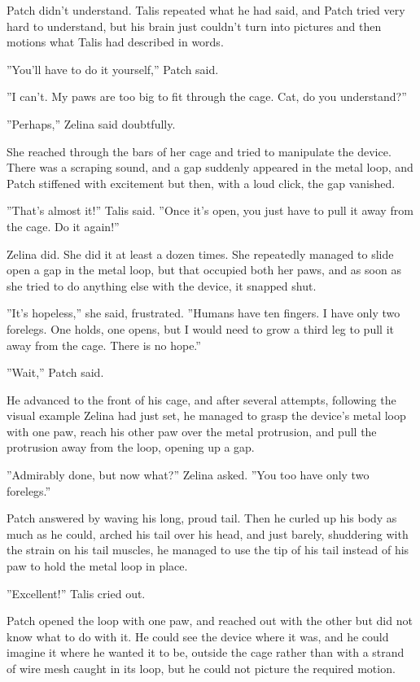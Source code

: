 \documentclass[12pt]{book}
\begin{document}
 Patch didn't understand. Talis repeated what he had said, and Patch tried very hard to understand, but his brain just couldn't turn into pictures and then motions what Talis had described in words.\par
 ''You'll have to do it yourself,'' Patch said.\par
 ''I can't. My paws are too big to fit through the cage. Cat, do you understand?''\par
 ''Perhaps,'' Zelina said doubtfully.\par
She reached through the bars of her cage and tried to manipulate the device. There was a scraping sound, and a gap suddenly appeared in the metal loop, and Patch stiffened with excitement %
 but then, with a loud click, the gap vanished.\par
''That's almost it!'' Talis said. ''Once it's open, you just have to pull it away from the cage. Do it again!''\par
Zelina did. She did it at least a dozen times. She repeatedly managed to slide open a gap in the metal loop, but that occupied both her paws, and as soon as she tried to do anything else with the device, it snapped shut.\par
''It's hopeless,'' she said, frustrated. ''Humans have ten fingers. I have only two forelegs. One holds, one opens, but I would need to grow a third leg to pull it away from the cage. There is no hope.''\par
''Wait,'' Patch said.\par
He advanced to the front of his cage, and after several attempts, following the visual example Zelina had just set, he managed to grasp the device's metal loop with one paw, reach his other paw over the metal protrusion, and pull the protrusion away from the loop, opening up a gap.\par
''Admirably done, but now what?'' Zelina asked. ''You too have only two forelegs.''\par
Patch answered by waving his long, proud tail. Then he curled up his body as much as he could, arched his tail over his head, and just barely, shuddering with the strain on his tail muscles, he managed to use the tip of his tail instead of his paw to hold the metal loop in place.\par
''Excellent!'' Talis cried out.\par
Patch opened the loop with one paw, and reached out with the other %
 but did not know what to do with it. He could see the device where it was, and he could imagine it where he wanted it to be, outside the cage rather than with a strand of wire mesh caught in its loop, but he could not picture the required motion.\par
\end{document}

